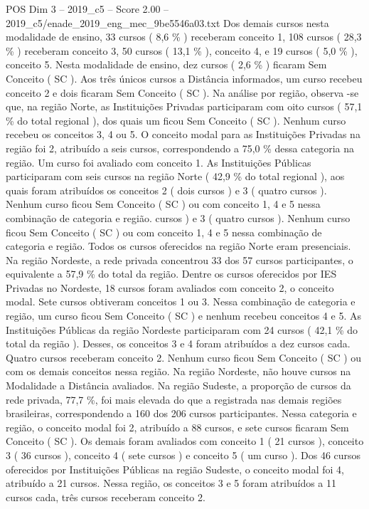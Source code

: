 \begin{textsample}{POS Dim 3 – 2019\_c5 – Score 2.00 – 2019\_c5/enade\_2019\_eng\_mec\_9be5546a03.txt}
Dos demais cursos nesta modalidade de ensino, 33 cursos ( 8,6 \% ) receberam conceito 1, 108 cursos ( 28,3 \% ) receberam conceito 3, 50 cursos ( 13,1 \% ), conceito 4, e 19 cursos ( 5,0 \% ), conceito 5.
Nesta modalidade de ensino, dez cursos ( 2,6 \% ) ficaram Sem Conceito ( SC ).
Aos três únicos cursos a Distância informados, um curso recebeu conceito 2 e dois ficaram Sem Conceito ( SC ).
Na análise por região, observa -se que, na região Norte, as Instituições Privadas participaram com oito cursos ( 57,1 \% do total regional ), dos quais um ficou Sem Conceito ( SC ).
Nenhum curso recebeu os conceitos 3, 4 ou 5.
O conceito modal para as Instituições Privadas na região foi 2, atribuído a seis cursos, correspondendo a 75,0 \% dessa categoria na região.
Um curso foi avaliado com conceito 1.
As Instituições Públicas participaram com seis cursos na região Norte ( 42,9 \% do total regional ), aos quais foram atribuídos os conceitos 2 ( dois cursos ) e 3 ( quatro cursos ).
Nenhum curso ficou Sem Conceito ( SC ) ou com conceito 1, 4 e 5 nessa combinação de categoria e região. cursos ) e 3 ( quatro cursos ).
Nenhum curso ficou Sem Conceito ( SC ) ou com conceito 1, 4 e 5 nessa combinação de categoria e região.
Todos os cursos oferecidos na região Norte eram presenciais.
Na região Nordeste, a rede privada concentrou 33 dos 57 cursos participantes, o equivalente a 57,9 \% do total da região.
Dentre os cursos oferecidos por IES Privadas no Nordeste, 18 cursos foram avaliados com conceito 2, o conceito modal.
Sete cursos obtiveram conceitos 1 ou 3.
Nessa combinação de categoria e região, um curso ficou Sem Conceito ( SC ) e nenhum recebeu conceitos 4 e 5.
As Instituições Públicas da região Nordeste participaram com 24 cursos ( 42,1 \% do total da região ).
Desses, os conceitos 3 e 4 foram atribuídos a dez cursos cada.
Quatro cursos receberam conceito 2.
Nenhum curso ficou Sem Conceito ( SC ) ou com os demais conceitos nessa região.
Na região Nordeste, não houve cursos na Modalidade a Distância avaliados.
Na região Sudeste, a proporção de cursos da rede privada, 77,7 \%, foi mais elevada do que a registrada nas demais regiões brasileiras, correspondendo a 160 dos 206 cursos participantes.
Nessa categoria e região, o conceito modal foi 2, atribuído a 88 cursos, e sete cursos ficaram Sem Conceito ( SC ).
Os demais foram avaliados com conceito 1 ( 21 cursos ), conceito 3 ( 36 cursos ), conceito 4 ( sete cursos ) e conceito 5 ( um curso ).
Dos 46 cursos oferecidos por Instituições Públicas na região Sudeste, o conceito modal foi 4, atribuído a 21 cursos.
Nessa região, os conceitos 3 e 5 foram atribuídos a 11 cursos cada, três cursos receberam conceito 2.

\end{textsample}
